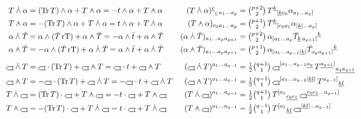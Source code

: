 \begin{align*}
  T\gmIdotwedge\alpha &= (\mathrm{Tr}\,T)\wedge\alpha + T\gmIwedgedot\alpha = -t\wedge\alpha + T\gmIwedgedot\alpha
  & (T\gmIdotwedge\alpha)^{\underline c}{}_{\underline c\,a_1\dots a_p} &= \tbinom{p+2}{2}\,T^{\underline k}{}_{[\underline{k}c_0}\alpha_{a_1\dots a_p]} \\
  T\gmIwedgedot\alpha &= -(\mathrm{Tr}\,T)\wedge\alpha + T\gmIdotwedge\alpha = t\wedge\alpha + T\gmIdotwedge\alpha
  & (T\gmIwedgedot\alpha)_{c_0a_1\dots a_p} &= \tbinom{p+1}{2}\,T^{\underline k}{}_{[c_0a_1}\alpha_{|\underline k|\dots a_p]} \\
  \alpha\gmIdotwedge\bar T &= \alpha\wedge(\bar T\,\mathrm{rT}) + \alpha\gmIwedgedot\bar T = -\alpha\wedge\bar t + \alpha\gmIwedgedot\bar T
  & (\alpha\gmIdotwedge\bar T)_{a_1\dots a_pa_{p+1}} &= \tbinom{p+2}{2}\,\alpha_{[a_1\dots a_p}\bar T_{\underline k\,a_{p+1}]}{}^{\underline k} \\
  \alpha\gmIwedgedot\bar T &= -\alpha\wedge(\bar T\,\mathrm{rT}) + \alpha\gmIdotwedge\bar T = \alpha\wedge\bar t + \alpha\gmIdotwedge\bar T
  & (\alpha\gmIwedgedot\bar T)_{a_1\dots a_pa_{p+1}} &= \tbinom{p+1}{2}\,\alpha_{[a_1\dots a_{p-1}|\underline k|}\bar T_{a_pa_{p+1}]}{}^{\underline k} \\[4pt]
  \gmIhustsym\gmIdotwedge T &= \gmIhustsym\cdot(\mathrm{Tr}\,T) + \gmIhustsym\gmIwedgedot T = \gmIhustsym\cdot t + \gmIhustsym\gmIwedgedot T
  & (\gmIhustsym\gmIdotwedge T)^{a_1\dots a_{q-1}} &= \tfrac12\tbinom{q+1}{1}\,\gmIhustsym^{[a_1\dots a_{q-1}\underline{a_q}}\,T^{\underline{a_{q+1}}]}{}_{\underline{a_q}\underline{a_{q+1}}} \\
  \gmIhustsym\gmIwedgedot T &= -\gmIhustsym\cdot(\mathrm{Tr}\,T) + \gmIhustsym\gmIdotwedge T = -\gmIhustsym\cdot t + \gmIhustsym\gmIdotwedge T
  & (\gmIhustsym\gmIwedgedot T)^{a_1\dots a_{q-1}} &= \tfrac12\tbinom{q-1}{1}\,\gmIhustsym^{[a_1\dots a_{q-2}|\underline{kl}|}\,T^{a_{q-1}]}{}_{\underline{kl}} \\
  T\gmIdotwedge\gmIhustsym &= (\mathrm{Tr}\,T)\cdot\gmIhustsym + T\gmIwedgedot\gmIhustsym = -t\cdot\gmIhustsym + T\gmIwedgedot\gmIhustsym
  & (T\gmIdotwedge\gmIhustsym)^{a_1\dots a_{q-1}} &= \tfrac12\tbinom{q+1}{1}\,T^{[a_1}{}_{\underline{c_0}\underline{c_1}}\,\gmIhustsym^{\underline{c_0}\underline{c_1}\dots a_{q-1}]} \\
  T\gmIwedgedot\gmIhustsym &= -(\mathrm{Tr}\,T)\cdot\gmIhustsym + T\gmIdotwedge\gmIhustsym = t\cdot\gmIhustsym + T\gmIdotwedge\gmIhustsym
  & (T\gmIwedgedot\gmIhustsym)^{a_1\dots a_{q-1}} &= \tfrac12\tbinom{q-1}{1}\,T^{[a_1}{}_{\underline{kl}}\,\gmIhustsym^{|\underline{kl}|\dots a_{q-1}]}
\end{align*}

